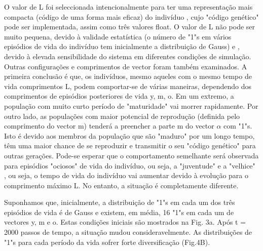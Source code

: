 \documentclass{article}
\begin{document}
O valor de L foi seleccionada intencionalmente para ter uma representação mais compacta (código de uma forma mais eficaz) do indivíduo , cujo "código genético" pode ser implementada, assim como três valores float. O valor de L não pode ser muito pequena, devido à validade estatística (o número de "1"s em vários episódios de vida do indivíduo tem inicialmente a distribuição de Gauss) e , devido à elevada sensibilidade do sistema em diferentes condições de simulação. Outras configurações e comprimentos de vector foram também examinados. A primeira conclusão é que, os indivíduos, mesmo aqueles com o mesmo tempo de vida comprimentos L, podem comportar-se de várias maneiras, dependendo dos comprimentos de episódios posteriores de vida y, m, o. Em um extremo, a população com muito curto período de "maturidade" vai morrer rapidamente. Por outro lado, as populações com maior potencial de reprodução (definida pelo comprimento do vector m) tenderá a preencher a parte m do vector $\alpha$ com "1"s. Isto é devido aos membros da população que são "maduro" por um longo tempo, têm uma maior chance de se reproduzir e transmitir o seu "código genético" para outras gerações. Pode-se esperar que o comportamento semelhante será observada para episódios "ociosos" de vida do indivíduo, ou seja, a "juventude" e a "velhice" , ou seja, o tempo de vida do indivíduo vai aumentar devido à evolução para o comprimento máximo L. No entanto, a situação é completamente diferente.


Suponhamos que, inicialmente, a distribuição de "1"s em cada um dos três episódios de vida é de Gauss e existem, em média, 16 "1"s em cada um de vectores y, m e o. Estas condições iniciais são mostrados na Fig. 3a. Após t = 2000 passos de tempo, a situação mudou consideravelmente. As distribuições de "1"s para cada período da vida sofrer forte diversificação (Fig.4B).

\end{document}
